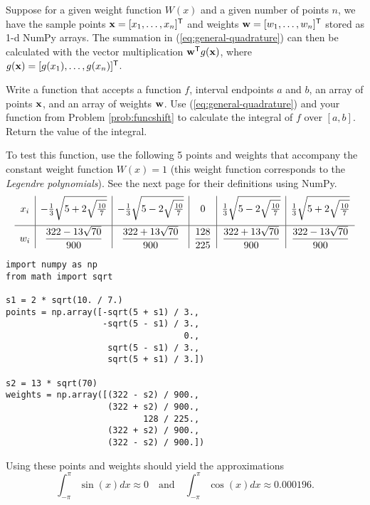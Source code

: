 Suppose for a given weight function $W(x)$ and a given number of points $n$, we have the sample points $\mathbf{x} = [x_1,\ldots,x_n]^{\mathsf T}$ and weights $\mathbf{w} = [w_1,\ldots,w_n]^{\mathsf T}$ stored as 1-d NumPy arrays.
The summation in (\ref{eq:general-quadrature}) can then be calculated with the vector multiplication $\mathbf{w}^{\mathsf T} g(\mathbf{x})$, where $g(\mathbf{x}) = [g(x_1),\ldots,g(x_n)]^{\mathsf T}$.

\begin{problem} %
Write a function that accepts a function $f$, interval endpoints $a$ and $b$, an array of points $\mathbf{x}$, and an array of weights $\mathbf{w}$.
Use (\ref{eq:general-quadrature}) and your function from Problem \ref{prob:funcshift} to calculate the integral of $f$ over $[a,b]$.
Return the value of the integral.

To test this function, use the following 5 points and weights that accompany the constant weight function $W(x) = 1$ (this weight function corresponds to the \emph{Legendre polynomials}). %
See the next page for their definitions using NumPy.
\[
\centering %
\begin{array}{c|c|c|c|c|c}
    x_i
    & -\frac{1}{3}\sqrt{5 + 2\sqrt{\frac{10}{7}}}
    & -\frac{1}{3}\sqrt{5 - 2\sqrt{\frac{10}{7}}}
    & 0
    & \frac{1}{3}\sqrt{5 - 2\sqrt{\frac{10}{7}}}
    & \frac{1}{3}\sqrt{5 + 2\sqrt{\frac{10}{7}}}
    \\[1em] \hline
    w_i
    & \dfrac{322-13\sqrt{70}}{900}
    & \dfrac{322+13\sqrt{70}}{900}
    & \dfrac{128}{225}
    & \dfrac{322+13\sqrt{70}}{900}
    & \dfrac{322-13\sqrt{70}}{900}
\end{array}
\]

\begin{lstlisting}
import numpy as np
from math import sqrt

s1 = 2 * sqrt(10. / 7.)
points = np.array([-sqrt(5 + s1) / 3.,
                   -sqrt(5 - s1) / 3.,
                                   0.,
                    sqrt(5 - s1) / 3.,
                    sqrt(5 + s1) / 3.])

s2 = 13 * sqrt(70)
weights = np.array([(322 - s2) / 900.,
                    (322 + s2) / 900.,
                           128 / 225.,
                    (322 + s2) / 900.,
                    (322 - s2) / 900.])
\end{lstlisting}
Using these points and weights should yield the approximations \[\int_{-\pi}^\pi \sin(x)dx \approx 0\quad\text{and}\quad\int_{-\pi}^\pi \cos(x)dx \approx 0.000196.\]
\end{problem}

